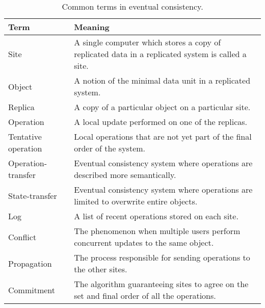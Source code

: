 \documentclass[a4paper,12pt]{report}
\begin{document}
\begin{table}
    \small
	\centering
    \begin{tabular}{l|p{}}
    	\toprule
   		Term & Meaning \\
    	\midrule
    	Site & A single computer which stores a copy of replicated data in a replicated system is called a site. \\
    	Object & A notion of the minimal data unit in a replicated system. \\
    	Replica & A copy of a particular object on a particular site. \\
        Operation & A local update performed on one of the replicas. \\
        Tentative operation & Local operations that are not yet part of the final order of the system. \\
        Operation-transfer & Eventual consistency system where operations are described more semantically. \\
        State-transfer & Eventual consistency system where operations are limited to overwrite entire objects. \\
        Log & A list of recent operations stored on each site. \\
        Conflict & The phenomenon when multiple users perform concurrent updates to the same object. \\
        Propagation & The process responsible for sending operations to the other sites. \\
        Commitment & The algorithm guaranteeing sites to agree on the set and final order of all the operations. \\
    	\bottomrule
    \end{tabular}
    \caption{Common terms in eventual consistency.}
\end{table}
\end{document}

